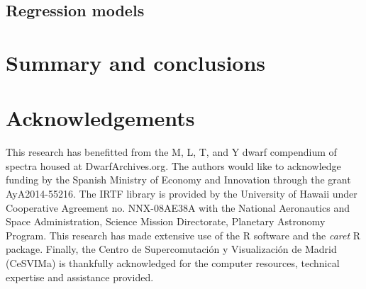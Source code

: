 \documentclass[a4paper,fleqn,usenatbib]{mnras}
\begin{document}
\subsection{Regression models}


\section{Summary and conclusions}
\label{sec:summary}


\section*{Acknowledgements}
This research has benefitted from the M, L, T, and Y dwarf compendium
of spectra housed at DwarfArchives.org.  The authors would like to
acknowledge funding by the Spanish Ministry of Economy and Innovation
through the grant AyA2014-55216. The IRTF library is provided by the
University of Hawaii under Cooperative Agreement no. NNX-08AE38A with
the National Aeronautics and Space Administration, Science Mission
Directorate, Planetary Astronomy Program. This research has made
extensive use of the R software \cite{R} and the {\it caret} R
package. Finally, the Centro de Supercomutaci\'on y Visualizaci\'on 
de Madrid (CeSVIMa) is thankfully acknowledged for the computer
resources, technical expertise and assistance provided.


{}


\begin{appendix}
\label{app}



\end{appendix}
\end{document}
